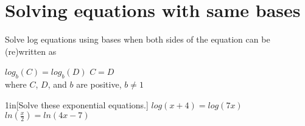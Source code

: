 \section{Solving equations with same bases}

\begin{minipage}{0.5\textwidth}
    Solve log equations using
     bases when both sides of the equation
    can be (re)written as \underline{\hspace{2in}}
\end{minipage}
\begin{minipage}{0.49\textwidth}
    \begin{myCenteredBox}[width=2.75in,]
        \centering%
        $log_b(C) = log_b(D)$ \quad {\Large $\Leftrightarrow$} \quad $C = D$
        \normalsize\\[0.75\onelineskip]\small
        where $C$, $D$, and $b$ are positive, $b \neq 1$
    \end{myCenteredBox}
    
\end{minipage}


\begin{my2Problems}{1in}[Solve these exponential equations.]
    {
        $log(x+4) = log(7x)$
    }
    {
        $ln(\frac{x}{2}) = ln(4x-7)$
    }
\end{my2Problems}
